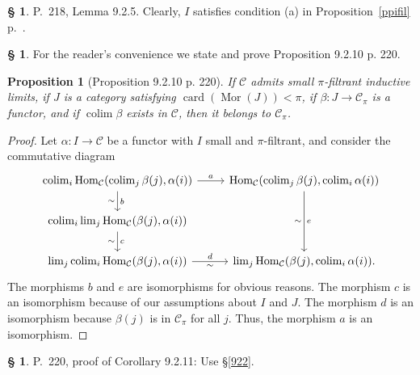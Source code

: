 \documentclass[12pt]{article}%
\newtheorem{prop}[thm]{Proposition}
\theoremstyle{remark}
\theoremstyle{definition}
\newtheorem{s}[thm]{\S}%
\newcommand{\C}{\mathcal C}
\DeclareMathOperator*{\colim}{colim}%
\DeclareMathOperator{\card}{card}%
\DeclareMathOperator{\Hom}{Hom}%
\DeclareMathOperator{\Mor}{Mor}
\begin{document}
%

\begin{s}
P.~218, Lemma 9.2.5. Clearly, $I$ satisfies condition (a) in Proposition~\ref{ppifil} p.~\pageref{ppifil}. 
\end{s}

%

\begin{s}
For the reader's convenience we state and prove Proposition 9.2.10 p. 220. 

\begin{prop}[Proposition 9.2.10 p. 220]
If $\C$ admits small $\pi$-filtrant inductive limits, if $J$ is a category satisfying $\card(\Mor(J))<\pi$, if $\beta:J\to\C_\pi$ is a functor, and if $\colim\beta$ exists in $\C$, then it belongs to $\C_\pi$. 
\end{prop}

\begin{proof}
Let $\alpha:I\to\C$ be a functor with $I$ small and $\pi$-filtrant, and consider the commutative diagram
$$
\begin{tikzcd}
\colim_i\Hom_\C(\colim_j\beta(j),\alpha(i))\ar{r}{a}\ar{d}{b}[swap]{\sim}&\Hom_\C(\colim_j\beta(j),\colim_i\alpha(i))\ar{dd}{e}[swap]{\sim}\\ 
\colim_i\lim_j\Hom_\C(\beta(j),\alpha(i))\ar{d}{c}[swap]{\sim}\\ 
\lim_j\colim_i\Hom_\C(\beta(j),\alpha(i))\ar{r}{d}[swap]{\sim}&\lim_j\Hom_\C(\beta(j),\colim_i\alpha(i)).
\end{tikzcd}
$$ 
The morphisms $b$ and $e$ are isomorphisms for obvious reasons. The morphism $c$ is an isomorphism because of our assumptions about $I$ and $J$. The morphism $d$ is an isomorphism because $\beta(j)$ is in $\C_\pi$ for all $j$. Thus, the morphism $a$ is an isomorphism. 
\end{proof}
\end{s}

%

\begin{s} 
P.~220, proof of Corollary 9.2.11: Use \S\ref{922}.
\end{s}

%
\end{document}

